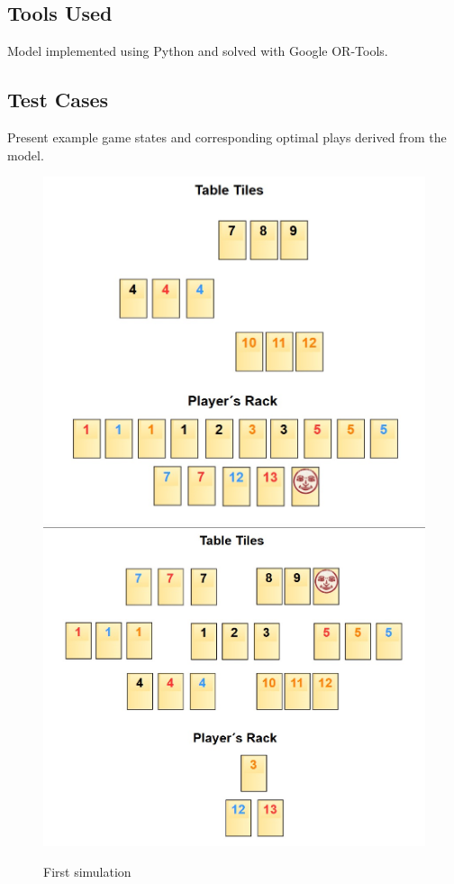 \documentclass[11pt,letterpaper]{article}
\begin{document}
\subsection*{Tools Used}
Model implemented using Python and solved with Google OR-Tools\cite{or_tools}.

\subsection*{Test Cases}
Present example game states and corresponding optimal plays derived from the model.

\newpage

\begin{figure}[H]
    \centering
    \includegraphics[width=.8\textwidth]{Figures/Initial_Board.png}
    \includegraphics[width=.8\textwidth]{Figures/Final_Board.png}
    \caption{First simulation}
\end{figure}
\end{document}
